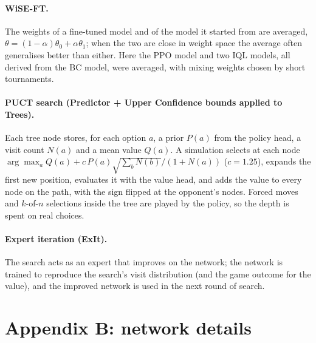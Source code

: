 \documentclass{article}
\begin{document}
\paragraph*{WiSE-FT.} The weights of a fine-tuned model and of the model it started from are averaged, $\theta=(1-\alpha)\theta_0+\alpha\theta_1$; when the two are close in weight space the average often generalises better than either. Here the PPO model and two IQL models, all derived from the BC model, were averaged, with mixing weights chosen by short tournaments.
\paragraph*{PUCT search (Predictor + Upper Confidence bounds applied to Trees).} Each tree node stores, for each option $a$, a prior $P(a)$ from the policy head, a visit count $N(a)$ and a mean value $Q(a)$. A simulation selects at each node $\arg\max_a Q(a)+c\,P(a)\sqrt{\sum_b N(b)}/(1+N(a))$ ($c{=}1.25$), expands the first new position, evaluates it with the value head, and adds the value to every node on the path, with the sign flipped at the opponent's nodes. Forced moves and $k$-of-$n$ selections inside the tree are played by the policy, so the depth is spent on real choices.
\paragraph*{Expert iteration (ExIt).} The search acts as an expert that improves on the network; the network is trained to reproduce the search's visit distribution (and the game outcome for the value), and the improved network is used in the next round of search.

\section*{Appendix B: network details}\label{app:features}\label{app:gen1}
\end{document}
